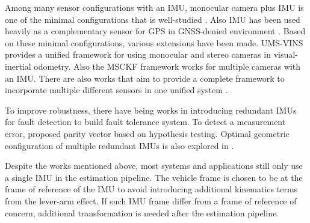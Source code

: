 \documentclass[conference]{IEEEtran}
\begin{document}



Among many sensor configurations with an IMU, monocular camera plus IMU is one of the minimal configurations that is well-studied \cite{qin2018_vins-mono, 10616216}. Also IMU has been used heavily as a complementary sensor for GPS in GNSS-denied environment \cite{1008998, 8987949}. Based on these minimal configurations, various extensions have been made. UMS-VINS \cite{jiang2023_UMS-VINS} provides a unified framework for using monocular and stereo cameras in visual-inertial odometry. Also the MSCKF framework \cite{Anastasios2007_MSCKF} works for multiple cameras with an IMU. There are also works that aim to provide a complete framework to incorporate multiple different sensors in one unified system \cite{10587194}.

To improve robustness, there have being works in introducing redundant IMUs for fault detection to build fault tolerance system. To detect a measurement error, \cite{Sturza1988_redundant} proposed parity vector based on hypothesis testing. Optimal geometric configuration of multiple redundant IMUs is also explored in \cite{Colomina2004REDUNDANTIF, guerrier2009, xue2023}.

Despite the works mentioned above, most systems and applications still only use a single IMU in the estimation pipeline. The vehicle frame is chosen to be at the frame of reference of the IMU to avoid introducing additional kinematics terms from the lever-arm effect. If such IMU frame differ from a frame of reference of concern, additional transformation is needed after the estimation pipeline.
\end{document}
